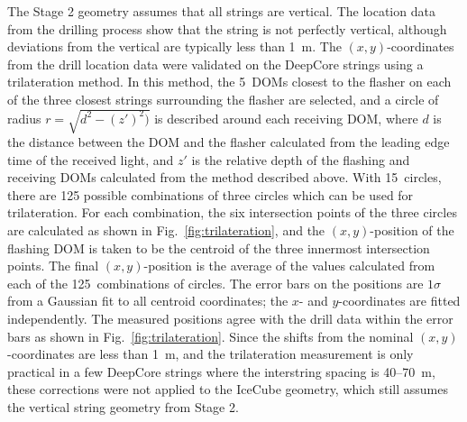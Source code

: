 The Stage 2 geometry assumes that all strings are vertical. The
location data from the drilling process show that the string is not perfectly vertical,
although deviations from the vertical are typically less than 1~m. The
$(x,y)$-coordinates from the drill location data were validated on the DeepCore strings
using a trilateration method. In this method, the 5~DOMs closest to the
flasher on each of the three closest strings surrounding the flasher are
selected, and a circle of radius $r = \sqrt{d^2 - (z')^2)}$ is
described around each receiving DOM, where $d$ is the distance between the DOM
and the flasher calculated from the leading edge time of the received
light, and $z'$ is the relative depth of the flashing and receiving
DOMs calculated from the method described above. With 15~circles,
there are 125 possible combinations of three circles which can be used
for trilateration. For each combination, the six intersection points
of the three circles are calculated as shown in Fig.~\ref{fig:trilateration}, and the $(x,y)$-position of the flashing DOM
is taken to be the centroid of the three innermost intersection
points. The final $(x,y)$-position is the average of the values
calculated from each of the 125~combinations of circles. The
error bars on the positions are $1 \sigma$ from a Gaussian fit to all centroid
coordinates; the $x$- and $y$-coordinates are fitted independently. The
measured positions agree with the drill data within the error bars as shown in
Fig.~\ref{fig:trilateration}. Since the shifts from the nominal
$(x,y)$-coordinates are less than 1~m, and the trilateration measurement is only
practical in a few DeepCore strings where the interstring spacing is 40--70~m, these
corrections were not applied to the IceCube geometry, which still assumes
the vertical string geometry from Stage 2.


